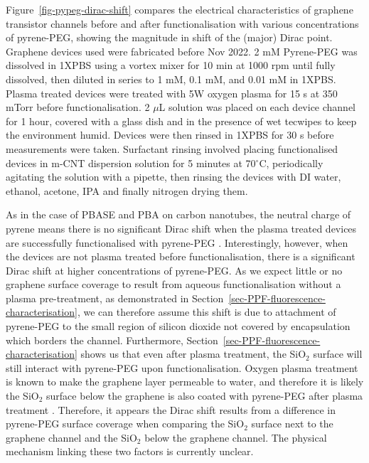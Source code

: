 \documentclass[
  a4paper,
]{scrbook}
\begin{document}
Figure~\ref{fig-pypeg-dirac-shift} compares the electrical
characteristics of graphene transistor channels before and after
functionalisation with various concentrations of pyrene-PEG, showing the
magnitude in shift of the (major) Dirac point. Graphene devices used
were fabricated before Nov 2022. 2 mM Pyrene-PEG was dissolved in 1XPBS
using a vortex mixer for 10 min at 1000 rpm until fully dissolved, then
diluted in series to 1 mM, 0.1 mM, and 0.01 mM in 1XPBS. Plasma treated
devices were treated with 5W oxygen plasma for 15 s at 350 mTorr before
functionalisation. 2 \(\mu\)L solution was placed on each device channel
for 1 hour, covered with a glass dish and in the presence of wet
tecwipes to keep the environment humid. Devices were then rinsed in
1XPBS for 30 s before measurements were taken. Surfactant rinsing
involved placing functionalised devices in m-CNT dispersion solution for
5 minutes at 70\(^\circ\)C, periodically agitating the solution with a
pipette, then rinsing the devices with DI water, ethanol, acetone, IPA
and finally nitrogen drying them.

As in the case of PBASE and PBA on carbon nanotubes, the neutral charge
of pyrene means there is no significant Dirac shift when the plasma
treated devices are successfully functionalised with pyrene-PEG
\autocite{Lerner2012}. Interestingly, however, when the devices are not
plasma treated before functionalisation, there is a significant Dirac
shift at higher concentrations of pyrene-PEG. As we expect little or no
graphene surface coverage to result from aqueous functionalisation
without a plasma pre-treatment, as demonstrated in
Section~\ref{sec-PPF-fluorescence-characterisation}, we can therefore
assume this shift is due to attachment of pyrene-PEG to the small region
of silicon dioxide not covered by encapsulation which borders the
channel. Furthermore,
Section~\ref{sec-PPF-fluorescence-characterisation} shows us that even
after plasma treatment, the SiO\(_2\) surface will still interact with
pyrene-PEG upon functionalisation. Oxygen plasma treatment is known to
make the graphene layer permeable to water, and therefore it is likely
the SiO\(_2\) surface below the graphene is also coated with pyrene-PEG
after plasma treatment \autocite{Surwade2015}. Therefore, it appears the
Dirac shift results from a difference in pyrene-PEG surface coverage
when comparing the SiO\(_2\) surface next to the graphene channel and
the SiO\(_2\) below the graphene channel. The physical mechanism linking
these two factors is currently unclear.
\end{document}
